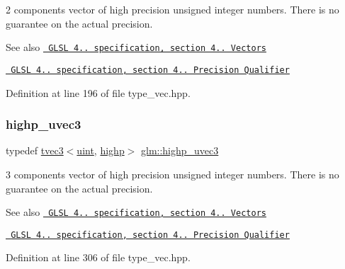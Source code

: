 2 components vector of high precision unsigned integer numbers. There is no guarantee on the actual precision.

\begin{DoxySeeAlso}{See also}
\href{http://www.opengl.org/registry/doc/GLSLangSpec.4.20.8.pdf}{\texttt{ G\+L\+SL 4.. specification, section 4.. Vectors}} 

\href{http://www.opengl.org/registry/doc/GLSLangSpec.4.20.8.pdf}{\texttt{ G\+L\+SL 4.. specification, section 4.. Precision Qualifier}} 
\end{DoxySeeAlso}


Definition at line 196 of file type\+\_\+vec.\+hpp.

\mbox{\label{group__core__precision_ga90ab9c4694f5af23c7dcd4eb9e47e255}} 
\subsubsection{\texorpdfstring{highp\_uvec3}{highp\_uvec3}}
{\footnotesize\ttfamily typedef \mbox{\hyperlink{structglm_1_1tvec3}{tvec3}}$<$\mbox{\hyperlink{group__core__precision_ga4fd29415871152bfb5abd588334147c8}{uint}}, \mbox{\hyperlink{namespaceglm_a0f04f086094c747d227af4425893f545ac6f7eab42eacbb10d59a58e95e362074}{highp}}$>$ \mbox{\hyperlink{group__core__precision_ga90ab9c4694f5af23c7dcd4eb9e47e255}{glm\+::highp\+\_\+uvec3}}}

3 components vector of high precision unsigned integer numbers. There is no guarantee on the actual precision.

\begin{DoxySeeAlso}{See also}
\href{http://www.opengl.org/registry/doc/GLSLangSpec.4.20.8.pdf}{\texttt{ G\+L\+SL 4.. specification, section 4.. Vectors}} 

\href{http://www.opengl.org/registry/doc/GLSLangSpec.4.20.8.pdf}{\texttt{ G\+L\+SL 4.. specification, section 4.. Precision Qualifier}} 
\end{DoxySeeAlso}


Definition at line 306 of file type\+\_\+vec.\+hpp.

\mbox{\label{group__core__precision_gaced82ea2e726f079d4d72cf180a75b8b}} 
